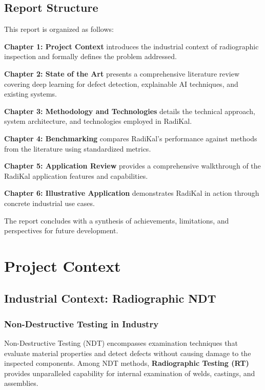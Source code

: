 \documentclass[12pt,a4paper]{report}
\begin{document}
\section*{Report Structure}

This report is organized as follows:

\textbf{Chapter 1: Project Context} introduces the industrial context of radiographic inspection and formally defines the problem addressed.

\textbf{Chapter 2: State of the Art} presents a comprehensive literature review covering deep learning for defect detection, explainable AI techniques, and existing systems.

\textbf{Chapter 3: Methodology and Technologies} details the technical approach, system architecture, and technologies employed in RadiKal.

\textbf{Chapter 4: Benchmarking} compares RadiKal's performance against methods from the literature using standardized metrics.

\textbf{Chapter 5: Application Review} provides a comprehensive walkthrough of the RadiKal application features and capabilities.

\textbf{Chapter 6: Illustrative Application} demonstrates RadiKal in action through concrete industrial use cases.

The report concludes with a synthesis of achievements, limitations, and perspectives for future development.

\chapter{Project Context}

\section{Industrial Context: Radiographic NDT}

\subsection{Non-Destructive Testing in Industry}

Non-Destructive Testing (NDT) encompasses examination techniques that evaluate material properties and detect defects without causing damage to the inspected components. Among NDT methods, \textbf{Radiographic Testing (RT)} provides unparalleled capability for internal examination of welds, castings, and assemblies.
\end{document}
